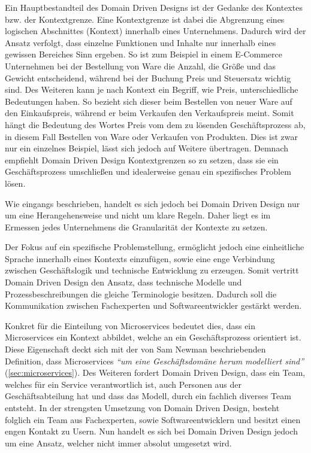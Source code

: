 Ein Hauptbestandteil des Domain Driven Designs ist der Gedanke des Kontextes bzw. der Kontextgrenze. Eine Kontextgrenze ist dabei die Abgrenzung eines logischen Abschnittes (Kontext) innerhalb eines Unternehmens. Dadurch wird der Ansatz verfolgt, dass einzelne Funktionen und Inhalte nur innerhalb eines gewissen Bereiches Sinn ergeben. So ist zum Beispiel in einem E-Commerce Unternehmen bei der Bestellung von Ware die Anzahl, die Größe und das Gewicht entscheidend, während bei der Buchung Preis und Steuersatz wichtig sind. Des Weiteren kann je nach Kontext ein Begriff, wie Preis, unterschiedliche Bedeutungen haben. So bezieht sich dieser beim Bestellen von neuer Ware auf den Einkaufspreis, während er beim Verkaufen den Verkaufspreis meint. Somit hängt die Bedeutung des Wortes Preis vom dem zu lösenden Geschäftsprozess ab, in diesem Fall Bestellen von Ware oder Verkaufen von Produkten. Dies ist zwar nur ein einzelnes Beispiel, lässt sich jedoch auf Weitere übertragen. Demnach empfiehlt Domain Driven Design  Kontextgrenzen so zu setzen, dass sie ein Geschäftsprozess umschließen und idealerweise genau ein spezifisches Problem lösen.


Wie eingangs beschrieben, handelt es sich jedoch bei Domain Driven Design nur um eine Herangehensweise und nicht um klare Regeln. Daher liegt es im Ermessen jedes Unternehmens die Granularität der Kontexte zu setzen.

Der Fokus auf ein spezifische Problemstellung, ermöglicht jedoch eine einheitliche Sprache innerhalb eines Kontexts einzufügen, sowie eine enge Verbindung zwischen Geschäftslogik und technische Entwicklung zu erzeugen. Somit vertritt Domain Driven Design den Ansatz, dass technische Modelle und Prozessbeschreibungen die gleiche Terminologie besitzen. Dadurch soll die Kommunikation zwischen Fachexperten und Softwareentwickler gestärkt werden.

Konkret für die Einteilung von Microservices bedeutet dies, dass ein Microservices ein Kontext abbildet, welche an ein Geschäftsprozess orientiert ist. Diese Eigenschaft deckt sich mit der von Sam Newman beschriebenden Definition, dass Microservices \textit{\enquote{um eine Geschäftsdomäne herum modelliert sind}} (\cref{sec:microservices}). Des Weiteren fordert Domain Driven Design, dass ein Team, welches für ein Service verantwortlich ist, auch Personen aus der Geschäftsabteilung hat und dass das Modell, durch ein fachlich diverses Team entsteht.
In der strengsten Umsetzung von Domain Driven Design, besteht folglich ein Team aus Fachexperten, sowie Softwareentwicklern und besitzt einen engen Kontakt zu Usern. Nun handelt es sich bei Domain Driven Design jedoch um eine Ansatz, welcher nicht immer absolut umgesetzt wird.

